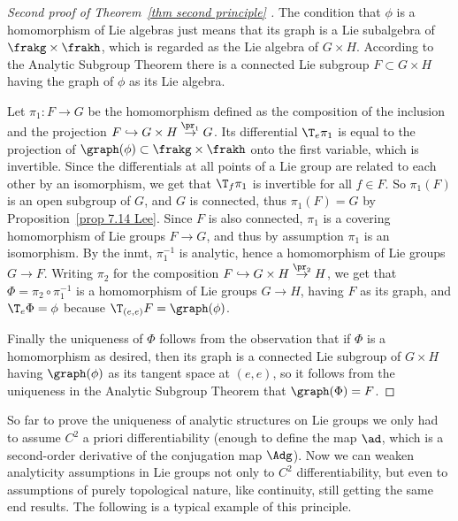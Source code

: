 \begin{proof}[Second proof of Theorem~\ref{thm second principle} {{\cite[Cor.~1.10.5]{DK}}}]
    The condition that $\phi$ is a homomorphism of Lie algebras just means that its graph is a Lie subalgebra of $\frakg\times\frakh$, which is regarded as the Lie algebra of $G\times H$. According to the Analytic Subgroup Theorem there is a connected Lie subgroup $F\subset G\times H$ having the graph of $\phi$ as its Lie algebra.

    Let $\pi_1:F\to G$ be the homomorphism defined as the composition of the inclusion and the projection $F\hookrightarrow G\times H\overset{\pr_1}{\to} G$. Its differential $\T_e \pi_1$ is equal to the projection of $\graph(\phi)\subset \frakg\times\frakh$ onto the first variable, which is invertible. Since the differentials at all points of a Lie group are related to each other by an isomorphism, we get that $\T_f\pi_1$ is invertible for all $f\in F$. So $\pi_1(F)$ is an open subgroup of $G$, and $G$ is connected, thus $\pi_1(F)=G$ by Proposition~\ref{prop 7.14 Lee}. Since $F$ is also connected, $\pi_1$ is a covering homomorphism of Lie groups $F\to G$, and thus by assumption $\pi_1$ is an isomorphism. By the \gls{inmt}, $\pi_1^{-1}$ is analytic, hence a homomorphism of Lie groups $G\to F$. Writing $\pi_2$ for the composition $F\hookrightarrow G\times H\overset{\pr_2}{\to} H$, we get that $\Phi=\pi_2\circ \pi_1^{-1}$ is a homomorphism of Lie groups $G\to H$, having $F$ as its graph, and $\T_e \Phi=\phi$ because $\T_{(e,e)}F=\graph(\phi)$.

    Finally the uniqueness of $\Phi$ follows from the observation that if $\Phi$ is a homomorphism as desired, then its graph is a connected Lie subgroup of $G\times H$ having $\graph(\phi)$ as its tangent space at $(e,e)$, so it follows from the uniqueness in the Analytic Subgroup Theorem that $\graph(\Phi)=F$.
\end{proof}


So far to prove the uniqueness of analytic structures on Lie groups we only had to assume $C^2$ a priori differentiability (enough to define the map $\ad$, which is a second-order derivative of the conjugation map $\Adg$). Now we can weaken analyticity assumptions in Lie groups not only to $C^2$ differentiability, but even to assumptions of purely topological nature, like continuity, still getting the same end results. The following is a typical example of this principle.

